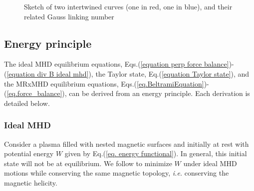 \documentclass[my_thesis.tex]{subfiles}
\begin{document}
\begin{figure}
	\hspace{.125\linewidth}
	\hfill
	\hspace{.125\linewidth}
	\caption{Sketch of two intertwined curves (one in red, one in blue), and their related Gauss linking number}
	\label{fig gauss linking number}
\end{figure}



\subsection{Energy principle}
The ideal MHD equilibrium equations, Eqs.(\ref{equation perp force balance})-(\ref{equation div B ideal mhd}), the Taylor state, Eq.(\ref{equation Taylor state}), and the MRxMHD equilibrium equations, Eqs.(\ref{eq.BeltramiEquation})-(\ref{eq.force_balance}), can be derived from an energy principle. Each derivation is detailed below.

\subsubsection{Ideal MHD} \label{energy principle ideal mhd}
Consider a plasma filled with nested magnetic surfaces and initially at rest with potential energy $W$ given by Eq.(\ref{eq. energy functional}). In general, this initial state will not be at equilibrium. We follow \citet{kruskalEquilibriumMagneticallyConfined1958} to minimize $W$ under ideal MHD motions while conserving the same magnetic topology, \textit{i.e.} conserving the magnetic helicity.
\end{document}
